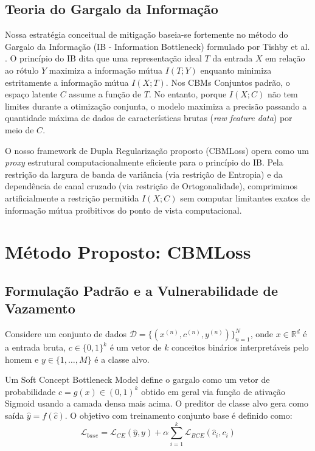 \documentclass[times,twocolumn,final]{elsarticle}
\begin{document}
\subsection{Teoria do Gargalo da Informação}
Nossa estratégia conceitual de mitigação baseia-se fortemente no método do Gargalo da Informação (IB - Information Bottleneck) formulado por Tishby et al. \citep{tishby2000information}. O princípio do IB dita que uma representação ideal $T$ da entrada $X$ em relação ao rótulo $Y$ maximiza a informação mútua $I(T; Y)$ enquanto minimiza estritamente a informação mútua $I(X; T)$. Nos CBMs Conjuntos padrão, o espaço latente $C$ assume a função de $T$. No entanto, porque $I(X; C)$ não tem limites durante a otimização conjunta, o modelo maximiza a precisão passando a quantidade máxima de dados de características brutas (\textit{raw feature data}) por meio de $C$.

O nosso framework de Dupla Regularização proposto (CBMLoss) opera como um \textit{proxy} estrutural computacionalmente eficiente para o princípio do IB. Pela restrição da largura de banda de variância (via restrição de Entropia) e da dependência de canal cruzado (via restrição de Ortogonalidade), comprimimos artificialmente a restrição permitida $I(X; C)$ sem computar limitantes exatos de informação mútua proibitivos do ponto de vista computacional.

\section{Método Proposto: CBMLoss}
\label{sec:method}

\subsection{Formulação Padrão e a Vulnerabilidade de Vazamento}
Considere um conjunto de dados $\mathcal{D} = \{(x^{(n)}, c^{(n)}, y^{(n)})\}_{n=1}^N$, onde $x \in \mathbb{R}^d$ é a entrada bruta, $c \in \{0, 1\}^k$ é um vetor de $k$ conceitos binários interpretáveis pelo homem e $y \in \{1, \dots, M\}$ é a classe alvo.

Um Soft Concept Bottleneck Model define o gargalo como um vetor de probabilidade $\hat{c} = g(x) \in (0,1)^k$ obtido em geral via função de ativação Sigmoid usando a camada densa mais acima. O preditor de classe alvo gera como saída $\hat{y} = f(\hat{c})$. O objetivo com treinamento conjunto base é definido como:
\begin{equation}
    \mathcal{L}_{base} = \mathcal{L}_{CE}(\hat{y}, y) + \alpha \sum_{i=1}^k \mathcal{L}_{BCE}(\hat{c}_i, c_i)
\end{equation}
\end{document}
